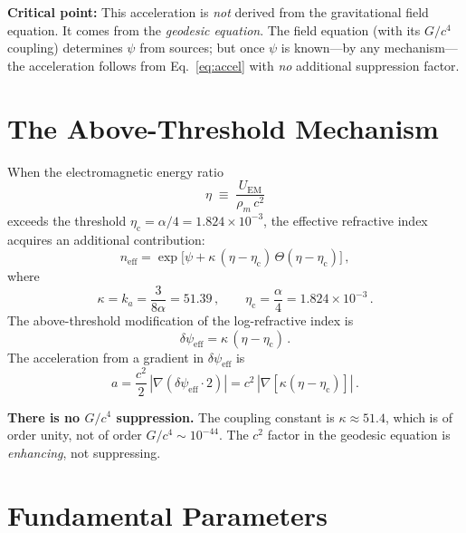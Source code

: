 \documentclass[12pt,a4paper]{article}
\newcommand{\psieff}{\psi_{\mathrm{eff}}}
\newcommand{\neff}{n_{\mathrm{eff}}}
\newcommand{\etac}{\eta_{\mathrm{c}}}
\begin{document}
\medskip\noindent
\textbf{Critical point:} This acceleration is \emph{not} derived from the gravitational field
equation. It comes from the \emph{geodesic equation}. The field equation (with its $G/c^4$ coupling)
determines $\psi$ from sources; but once $\psi$ is known---by any mechanism---the acceleration
follows from Eq.~\eqref{eq:accel} with \emph{no} additional suppression factor.

\section{The Above-Threshold Mechanism}
\label{sec:threshold}

When the electromagnetic energy ratio
\begin{equation}
\eta \;\equiv\; \frac{U_{\mathrm{EM}}}{\rho_m\, c^2}
\end{equation}
exceeds the threshold $\etac = \alpha/4 = 1.824 \times 10^{-3}$, the effective refractive index
acquires an additional contribution:
\begin{equation}
\label{eq:neff}
\neff = \exp\!\bigl[\psi + \kappa\,(\eta - \etac)\,\Theta(\eta - \etac)\bigr]\,,
\end{equation}
where
\begin{equation}
\kappa = k_a = \frac{3}{8\alpha} = 51.39\,,\qquad
\etac = \frac{\alpha}{4} = 1.824 \times 10^{-3}\,.
\end{equation}
The above-threshold modification of the log-refractive index is
\begin{equation}
\delta\psieff = \kappa\,(\eta - \etac)\,.
\end{equation}
The acceleration from a gradient in $\delta\psieff$ is
\begin{equation}
\label{eq:a_threshold}
\boxed{a = \frac{c^2}{2}\,|\nabla(\delta\psieff \cdot 2)| = c^2\,|\nabla[\kappa(\eta - \etac)]|\,.}
\end{equation}

\noindent\textbf{There is no $G/c^4$ suppression.} The coupling constant is $\kappa \approx 51.4$,
which is of order unity, not of order $G/c^4 \sim 10^{-44}$. The $c^2$ factor in the geodesic
equation is \emph{enhancing}, not suppressing.

\section{Fundamental Parameters}
\label{sec:params}
\end{document}
